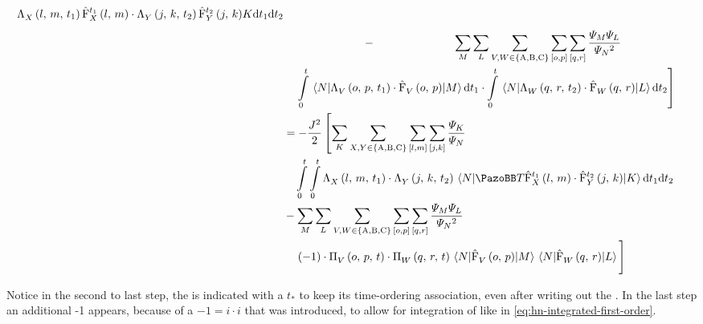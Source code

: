 \begin{equation}
\begin{split}
{        \VhamiltonianAnalyticalPart{$X$}{l}{m}{t_1} \VhamiltonianOperatorPart[t_1]{$X$}{l}{m}
        \cdot 
        \VhamiltonianAnalyticalPart{$Y$}{j}{k}{t_2} \VhamiltonianOperatorPart[t_2]{$Y$}{j}{k}
        }{K}            \mathrm{d}t_1\mathrm{d}t_2 \\
        &\stackrel{\phantom{\ref{eq:interaction-picture-v-ham-full}}}{-} 
        \lsum[M]\lsum[L]\lsum[V,W \in \left\{\text{A}, \text{B}, \text{C}\right\}]
        \fullneighborsum{o}{p}\fullneighborsum{q}{r}
        \frac{\psiN[M]\psiN[L]}{\psiN{}^2}\\&\quad
        \left.
        \int\limits_0^t \bracketHelper{N}{\VhamiltonianAnalyticalPart{$V$}{o}{p}{t_1} \cdot \VhamiltonianOperatorPart{$V$}{o}{p}}{M}  \mathrm{d}t_1
        \cdot
        \int\limits_0^t \bracketHelper{N}{\VhamiltonianAnalyticalPart{$W$}{q}{r}{t_2} \cdot \VhamiltonianOperatorPart{$W$}{q}{r}}{L}  \mathrm{d}t_2 \right]\\
        &=
        - \frac{J^2}{2} \left[ 
        \lsum[K]\lsum[X,Y \in \left\{\text{A}, \text{B}, \text{C}\right\}] \fullneighborsum{l}{m}\fullneighborsum{j}{k}
        \frac{\psiN[K]}{\psiN} 
        \right.
        \\&\quad
        \int\limits_0^t \int\limits_0^t  
        \VhamiltonianAnalyticalPart{$X$}{l}{m}{t_1}
        \cdot 
        \VhamiltonianAnalyticalPart{$Y$}{j}{k}{t_2}
        \bracketHelper{N}{\timeOrderingOperator
            \VhamiltonianOperatorPart[t_1]{$X$}{l}{m}
        \cdot 
            \VhamiltonianOperatorPart[t_2]{$Y$}{j}{k}
        }{K}            \mathrm{d}t_1\mathrm{d}t_2 \\
        & - 
        \lsum[M]\lsum[L]\lsum[V,W \in \left\{\text{A}, \text{B}, \text{C}\right\}]
        \fullneighborsum{o}{p}\fullneighborsum{q}{r}
        \frac{\psiN[M]\psiN[L]}{\psiN{}^2}\\&\quad
        \left.
            (-1) \cdot \VhamiltonianAnalyticalPartIntegrated{$V$}{o}{p}{t} 
            \cdot
            \VhamiltonianAnalyticalPartIntegrated{$W$}{q}{r}{t}
            \bracketHelper{N}{\VhamiltonianOperatorPart{$V$}{o}{p}}{M}
            \bracketHelper{N}{\VhamiltonianOperatorPart{$W$}{q}{r}}{L}
            \vphantom{
                \lsum[M]
            }
        \right]
    \end{split}
\end{equation}

Notice in the second to last step, the \VhamiltonianOperatorPart[t_\ast]{$\ast$}{\ast}{\ast} is indicated with a $t_\ast$ to keep its time-ordering association, even after writing out the .
In the last step an additional -1 appears, because of a $-1 = i \cdot i$ that was introduced, to allow for integration of  like in \autoref{eq:hn-integrated-first-order}.

